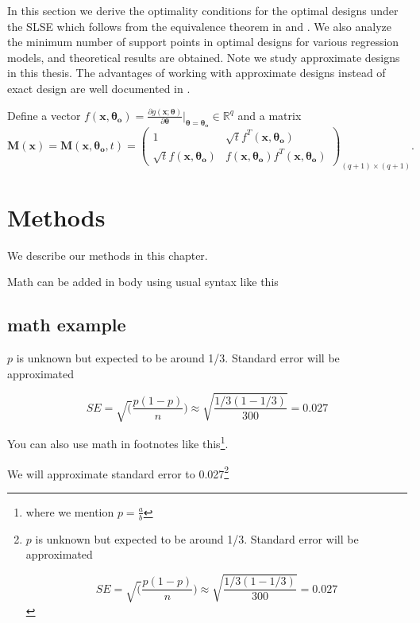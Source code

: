 \documentclass[
]{book}
\theoremstyle{definition}
\theoremstyle{definition}
\theoremstyle{definition}
\theoremstyle{definition}
\theoremstyle{remark}
\begin{document}
In this section we derive the optimality conditions for the optimal designs under the SLSE which follows from the equivalence theorem in \citet{kiefer-wolfowitz1959optimum} and \citet{kiefer1974general}. We also analyze the minimum number of support points in optimal designs for various regression models, and theoretical results are obtained. Note we study approximate designs in this thesis. The advantages of working with approximate designs instead of exact design are well documented in \citet{kiefer1985jack}.

Define a vector \(f(\boldsymbol{x,\theta_o})=\frac{\partial g(\boldsymbol{x};\boldsymbol{\theta})}{ \partial \boldsymbol{\theta}}\Big|_{\boldsymbol{\theta}=\boldsymbol{\theta_o}} \in \mathbb{R}^q\) and a matrix
\begin{equation}
\boldsymbol{M}(\boldsymbol{x})=\boldsymbol{M}(\boldsymbol{x},\boldsymbol{\theta_o},t)=\begin{pmatrix}
1       &   \sqrt{t}f^T(\boldsymbol{x},\boldsymbol{\theta_o})\\
\sqrt{t}f(\boldsymbol{x},\boldsymbol{\theta_o}) &f(\boldsymbol{x},\boldsymbol{\theta_o})f^T(\boldsymbol{x},\boldsymbol{\theta_o})
\end{pmatrix}_{(q+1)\times (q+1)}.
 \label{eq:M-matrix}
\end{equation}

\hypertarget{methods}{%
\chapter{Methods}\label{methods}}

We describe our methods in this chapter.

Math can be added in body using usual syntax like this

\hypertarget{math-example}{%
\section{math example}\label{math-example}}

\(p\) is unknown but expected to be around 1/3. Standard error will be approximated

\[
SE = \sqrt(\frac{p(1-p)}{n}) \approx \sqrt{\frac{1/3 (1 - 1/3)} {300}} = 0.027
\]

You can also use math in footnotes like this\footnote{where we mention \(p = \frac{a}{b}\)}.

We will approximate standard error to 0.027\footnote{\(p\) is unknown but expected to be around 1/3. Standard error will be approximated

  \[
  SE = \sqrt(\frac{p(1-p)}{n}) \approx \sqrt{\frac{1/3 (1 - 1/3)} {300}} = 0.027
  \]}
\end{document}
